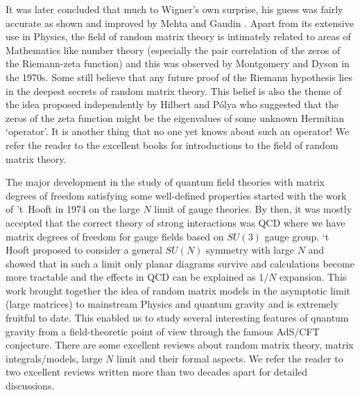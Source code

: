 \documentclass[letter,11pt]{article}
\begin{document}
It was later concluded that much to Wigner's own surprise, 
his guess was fairly accurate as shown and improved by Mehta \cite{MEHTA1960395} and 
Gaudin \cite{GAUDIN1961447}. Apart from its extensive use in Physics, the field of random matrix theory is intimately related to areas of Mathematics like number theory 
(especially the pair correlation of the zeros of the Riemann-zeta function) and this was 
observed by Montgomery and Dyson in the 1970s. Some still believe that any future proof of the
Riemann hypothesis lies in the
deepest secrets of random matrix theory. This belief is also the theme of the idea proposed 
independently by  Hilbert and P\'{o}lya who suggested that the zeros of the zeta function 
might be the eigenvalues of some unknown Hermitian `operator'. It is another thing that 
no one yet knows about such an operator! We refer the reader to the excellent books 
\cite{Meh2004, Akemann:2011csh} for introductions to the field of random matrix theory. 

The major development in the study of quantum field theories with matrix degrees of freedom satisfying some well-defined properties started with the work of 't~Hooft in 1974 on the large $N$ limit of gauge theories. By then, it was mostly accepted that the correct theory of 
strong interactions was QCD where we have matrix degrees of freedom for gauge fields based on $SU(3)$ gauge group. `t Hooft proposed to consider a general $SU(N)$ 
symmetry with large $N$ and showed that in such a limit only planar diagrams survive and calculations become more tractable and the effects in QCD can be explained as $1/N$ expansion. This work brought together the idea of random matrix models in the asymptotic limit (large matrices) to mainstream Physics and quantum gravity and is extremely fruitful to date. This enabled us to study several interesting features of quantum gravity 
from a field-theoretic point of view through the famous AdS/CFT conjecture.
There are some excellent reviews about random matrix theory, matrix integrals/models, large $N$ limit 
and their formal aspects. We refer the reader to two excellent reviews written more than two decades 
apart \cite{DiFrancesco:1993cyw,Eynard:2015aea} for detailed discussions. 
\end{document}
